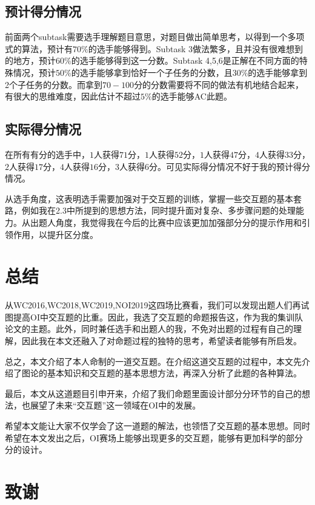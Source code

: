 \documentclass{noithesis}
\begin{document}
\subsection{预计得分情况}

前面两个subtask需要选手理解题目意思，对题目做出简单思考，以得到一个多项式的算法，预计有$70\%$的选手能够得到。Subtask 3做法繁多，且并没有很难想到的地方，预计$60\%$的选手能够得到这一分数。Subtask 4,5,6是正解在不同方面的特殊情况，预计$50\%$的选手能够拿到恰好一个子任务的分数，且$30\%$的选手能够拿到2个子任务的分数。而拿到$70-100$分的分数需要将不同的做法有机地结合起来，有很大的思维难度，因此估计不超过$5\%$的选手能够AC此题。

\subsection{实际得分情况}

在所有有分的选手中，$1$人获得$71$分，$1$人获得$52$分，$1$人获得$47$分，$4$人获得$33$分，$2$人获得$17$分，$4$人获得$16$分，$3$人获得$6$分。可见实际得分情况不好于我的预计得分情况。

从选手角度，这表明选手需要加强对于交互题的训练，掌握一些交互题的基本套路，例如我在2.3中所提到的思想方法，同时提升面对复杂、多步骤问题的处理能力。从出题人角度，我觉得我在今后的比赛中应该更加加强部分分的提示作用和引领作用，以提升区分度。

\section{总结}

从WC2016,WC2018,WC2019,NOI2019这四场比赛看，我们可以发现出题人们再试图提高OI中交互题的比重。因此，我选了交互题的命题报告这，作为我的集训队论文的主题。此外，同时兼任选手和出题人的我，不免对出题的过程有自己的理解，因此我在本文还融入了对命题过程的独特的思考，希望读者能够有所启发。

总之，本文介绍了本人命制的一道交互题。在介绍这道交互题的过程中，本文先介绍了图论的基本知识和交互题的基本思想方法，再深入分析了此题的各种算法。

最后，本文从这道题目引申开来，介绍了我们命题里面设计部分分环节的自己的想法，也展望了未来“交互题”这一领域在OI中的发展。

希望本文能让大家不仅学会了这一道题的解法，也领悟了交互题的基本思想。同时希望在本文发出之后，OI赛场上能够出现更多的交互题，能够有更加科学的部分分的设计。

\section{致谢}
\end{document}
